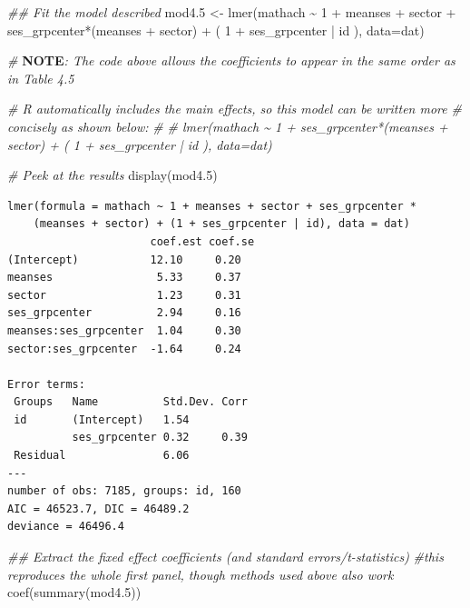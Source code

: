 \documentclass[
  letterpaper,
  DIV=11,
  numbers=noendperiod]{scrreprt}
\newenvironment{Shaded}{\begin{snugshade}}{\end{snugshade}}
\newcommand{\AlertTok}[1]{\textcolor[rgb]{1.00,0.00,0.00}{\textbf{#1}}}
\newcommand{\AttributeTok}[1]{\textcolor[rgb]{0.49,0.56,0.16}{#1}}
\newcommand{\CommentTok}[1]{\textcolor[rgb]{0.38,0.63,0.69}{\textit{#1}}}
\newcommand{\DecValTok}[1]{\textcolor[rgb]{0.25,0.63,0.44}{#1}}
\newcommand{\DocumentationTok}[1]{\textcolor[rgb]{0.73,0.13,0.13}{\textit{#1}}}
\newcommand{\FloatTok}[1]{\textcolor[rgb]{0.25,0.63,0.44}{#1}}
\newcommand{\FunctionTok}[1]{\textcolor[rgb]{0.02,0.16,0.49}{#1}}
\newcommand{\NormalTok}[1]{\textcolor[rgb]{0.00,0.44,0.13}{#1}}
\newcommand{\OtherTok}[1]{\textcolor[rgb]{0.00,0.44,0.13}{#1}}
\newcommand{\SpecialCharTok}[1]{\textcolor[rgb]{0.25,0.44,0.63}{#1}}
\begin{document}
\begin{Shaded}
\begin{Highlighting}[]
\DocumentationTok{\#\# Fit the model described }
\NormalTok{mod4}\FloatTok{.5} \OtherTok{\textless{}{-}} \FunctionTok{lmer}\NormalTok{(mathach }\SpecialCharTok{\textasciitilde{}} \DecValTok{1} \SpecialCharTok{+}\NormalTok{ meanses }\SpecialCharTok{+}\NormalTok{ sector }\SpecialCharTok{+}\NormalTok{ ses\_grpcenter}\SpecialCharTok{*}\NormalTok{(meanses }\SpecialCharTok{+}\NormalTok{ sector) }\SpecialCharTok{+}\NormalTok{ ( }\DecValTok{1} \SpecialCharTok{+}\NormalTok{ ses\_grpcenter }\SpecialCharTok{|}\NormalTok{ id ), }\AttributeTok{data=}\NormalTok{dat)}

\CommentTok{\# }\AlertTok{NOTE}\CommentTok{: The code above allows the coefficients to appear in the same order as in Table 4.5}

\CommentTok{\# R automatically includes the main effects, so this model can be written more}
\CommentTok{\# concisely as shown below:}
\CommentTok{\#}
\CommentTok{\# lmer(mathach \textasciitilde{} 1 + ses\_grpcenter*(meanses + sector) + ( 1 + ses\_grpcenter | id ), data=dat)}

\CommentTok{\# Peek at the results}
\FunctionTok{display}\NormalTok{(mod4}\FloatTok{.5}\NormalTok{)}
\end{Highlighting}
\end{Shaded}

\begin{verbatim}
lmer(formula = mathach ~ 1 + meanses + sector + ses_grpcenter * 
    (meanses + sector) + (1 + ses_grpcenter | id), data = dat)
                      coef.est coef.se
(Intercept)           12.10     0.20  
meanses                5.33     0.37  
sector                 1.23     0.31  
ses_grpcenter          2.94     0.16  
meanses:ses_grpcenter  1.04     0.30  
sector:ses_grpcenter  -1.64     0.24  

Error terms:
 Groups   Name          Std.Dev. Corr 
 id       (Intercept)   1.54          
          ses_grpcenter 0.32     0.39 
 Residual               6.06          
---
number of obs: 7185, groups: id, 160
AIC = 46523.7, DIC = 46489.2
deviance = 46496.4 
\end{verbatim}

\begin{Shaded}
\begin{Highlighting}[]
\DocumentationTok{\#\# Extract the fixed effect coefficients (and standard errors/t{-}statistics)}
\CommentTok{\#this reproduces the whole first panel, though methods used above also work}
\FunctionTok{coef}\NormalTok{(}\FunctionTok{summary}\NormalTok{(mod4}\FloatTok{.5}\NormalTok{))}
\end{Highlighting}
\end{Shaded}
\end{document}
